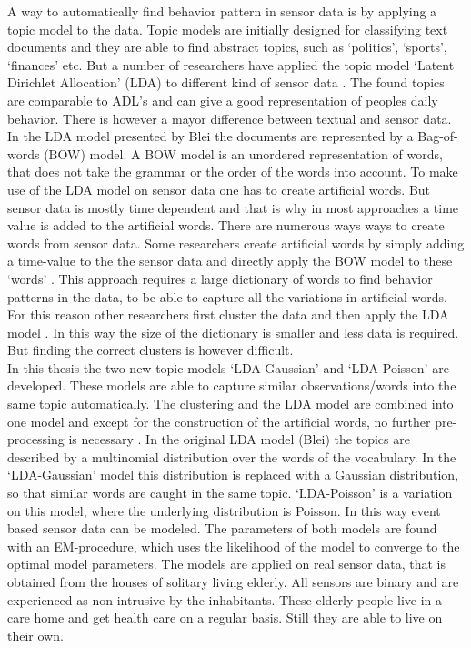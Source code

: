 A way to automatically find behavior pattern in sensor data is by applying a topic model to the data. Topic models are initially designed for classifying text documents and they are able to find abstract topics, such as `politics', `sports', `finances' etc. But a number of researchers have applied the topic model `Latent Dirichlet Allocation' (LDA) to different kind of sensor data \cite{farrahi2008daily,journals/percom/ChikhaouiWP12}. The found topics are comparable to ADL's and can give a good representation of peoples daily behavior.
There is however a mayor difference between textual and sensor data. In the LDA model presented by Blei \cite{blei2003latent} the documents are represented by a Bag-of-words (BOW) model. A BOW model is an unordered representation of words, that does not take the grammar or the order of the words into account.
To make use of the LDA model on sensor data one has to create artificial words. But sensor data is mostly time dependent and that is why in most approaches a time value is added to the artificial words. There are numerous ways ways to create words from sensor data.
Some researchers create artificial words by simply adding a time-value to the the sensor data and directly apply the BOW model to these `words' \cite{farrahi2008daily,EXSY:EXSY12033}. This approach requires a large dictionary of words to find behavior patterns in the data, to be able to capture all the variations in artificial words. For this reason other researchers first cluster the data and then apply the LDA model \cite{Huynh:2008:DAP:1409635.1409638,Casale:2009}. In this way the size of the dictionary is smaller and less data is required.  But finding the correct clusters is however difficult.\\

In this thesis the two new topic models `LDA-Gaussian' and `LDA-Poisson' are developed. These models are able to capture similar observations/words into the same topic automatically. The clustering and the LDA model are combined into one model and except for the construction of the artificial words, no further pre-processing is necessary .
In the original LDA model (Blei) the topics are described by a multinomial distribution over the words of the vocabulary. In the `LDA-Gaussian' model this distribution is replaced with a Gaussian distribution, so that similar words are caught in the same topic. `LDA-Poisson' is a variation on this model, where the underlying distribution is Poisson. In this way event based sensor data can be modeled.
The parameters of both models are found with an EM-procedure, which uses the likelihood of the model to converge to the optimal model parameters. The models are applied on real sensor data, that is obtained from the houses of solitary living elderly. 
All sensors are binary and are experienced as non-intrusive by the inhabitants. These elderly people live in a care home and get health care on a regular basis. Still they are able to live on their own.\\


